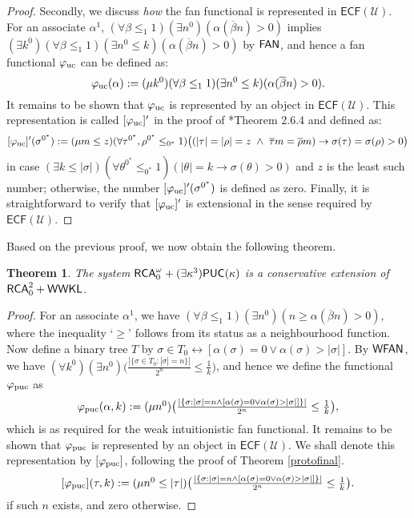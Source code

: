 \documentclass[reqno]{amsart}
\newtheorem{thm}{Theorem}
\def\FAN{\textup{\textsf{FAN}}}
\def\RCA{\textup{\textsf{RCA}}}
\def\PUC{\textup{\textsf{PUC}}}
\def\WWKL{\textup{\textsf{WWKL}}}
\def\FAN{\textup{\textsf{FAN}}}
\def\PUC{\textup{\textsf{PUC}}}
\def\WFAN{\textup{\textsf{WFAN}}}
\def\di{\rightarrow}
\def\asa{\leftrightarrow}
\numberwithin{equation}{section}
\numberwithin{thm}{section}
\begin{document}
\begin{proof}
Secondly, we discuss \emph{how} the fan functional is represented in $\textsf{ECF}(\mathcal{U})$.  For an associate $\alpha^{1}$, $(\forall \beta\leq_{1}1)(\exists n^{0})(\alpha(\overline{\beta}n)>0)$ implies $(\exists k^{0})(\forall \beta\leq_{1}1)(\exists n^{0}\leq k)(\alpha(\overline{\beta}n)>0)$ by $\FAN$, and hence a fan functional $\varphi_{\textup{uc}}$ can be defined as:
\[
\varphi_{\textup{uc}}(\alpha):=(\mu k^{0})(\forall \beta\leq_{1}1)(\exists n^{0}\leq k)(\alpha(\overline{\beta}n)>0).
\]
It remains to be shown that $\varphi_{\textup{uc}}$ is represented by an object in $\textsf{ECF}(\mathcal{U})$.  
This representation is called $[\varphi_{\textup{uc}}]'$ in the proof of \cite{troelstra1}*{Theorem 2.6.4} and defined as:  
%
\[
[\varphi_{\textup{uc}}]'(\sigma^{0^{*}}):=
(\mu m\leq z)(\forall \tau^{0^{*}}, \rho^{0^{*}}\leq_{0^{*}}1)\big((|\tau|=|\rho|=z ~\wedge~ \overline{\tau}m=\overline{\rho}m)\di \sigma(\tau)=\sigma(\rho)>0 \big)
\]
in case $(\exists k \leq |\sigma|)(\forall \theta^{0^{*}}\leq_{0^{*}}1)(|\theta|=k\di \sigma(\theta)>0)$ and $z$ is the least such number; otherwise, the number $[\varphi_{\textup{uc}}]'(\sigma^{0^{*}})$ is defined as zero.  Finally, it is straightforward to verify that $[\varphi_{\textup{uc}}]'$ is extensional in the sense required by $\textsf{ECF}(\mathcal{U})$.  %
%
%
\end{proof}
Based on the previous proof, we now obtain the following theorem.
\begin{thm}\label{photon}
The system $\RCA_{0}^{\omega}+(\exists \kappa^{3})\PUC(\kappa)$ is a conservative extension of $\RCA_{0}^{2}+\WWKL$.  
\end{thm}
\begin{proof}
For an associate $\alpha^{1}$, we have $(\forall \beta\leq_{1}1)(\exists n^{0})(n\geq\alpha(\overline{\beta}n)>0)$, where the inequality `$\geq$' follows from its status as a neighbourhood function.   
Now define a binary tree $T$ by $\sigma\in T_{0}\asa [\alpha(\sigma)=0\vee \alpha(\sigma)>|\sigma|]$.  
By $\WFAN$, we have $(\forall k^{0})(\exists n^{0})\big(\frac{|\{\sigma\in T_{0}:|\sigma|=n\}|}{2^{n}}\leq\frac{1}{k}\big)$, and hence we define the functional $\varphi_{\textup{puc}}$ as
\[\textstyle
\varphi_{\textup{puc}}(\alpha, k):=(\mu n^{0})\big(\frac{|\{\sigma:|\sigma|=n\wedge [\alpha(\sigma)=0\vee \alpha(\sigma)>|\sigma|]\}|}{2^{n}}\leq\frac{1}{k}\big),
\]
which is as required for the weak intuitionistic fan functional.  
It remains to be shown that $\varphi_{\textup{puc}}$ is represented by an object in $\textsf{ECF}(\mathcal{U})$.  
We shall denote this representation by $[\varphi_{\textup{puc}}]$, following the proof of Theorem \ref{protofinal}.    
\[\textstyle
[\varphi_{\textup{puc}}](\tau, k):=(\mu n^{0}\leq |\tau|)\big(\frac{|\{\sigma:|\sigma|=n\wedge [\alpha(\sigma)=0\vee \alpha(\sigma)>|\sigma|]\}|}{2^{n}}\leq\frac{1}{k}\big).
\]
if such $n$ exists, and zero otherwise.  
\end{proof}
\end{document}
